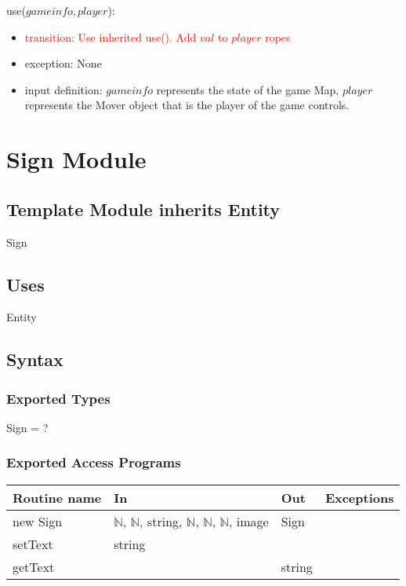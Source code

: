\documentclass[12pt]{article}
\newcommand{\m}[1]{\mbox{#1}}
\begin{document}
\noindent use($gameinfo, player$):
\begin{itemize}
    \item\textcolor{red}{ transition: Use inherited use(). Add $val$ to $player$ ropes}
    \item exception: None
    \item input definition: $gameinfo$ represents the state of the game Map, $player$ represents the Mover object that is the player of the game controls.
\end{itemize}

\newpage

\section*{Sign Module}

\subsection*{Template Module inherits Entity}

Sign

\subsection*{Uses}

Entity

\subsection*{Syntax}

\subsubsection*{Exported Types}

Sign = ?

\subsubsection*{Exported Access Programs}

\begin{tabular}{| l | l | l | l |}
\hline
\textbf{Routine name} & \textbf{In} & \textbf{Out} & \textbf{Exceptions}\\
\hline
new Sign & $\mathbb{N}$, $\mathbb{N}$, string, $\mathbb{N}$, $\mathbb{N}$, $\mathbb{N}$, image & Sign & ~\\
\hline
setText & string & ~ & ~\\
\hline
getText & ~ & string & ~\\
\hline
\end{tabular}
\end{document}
